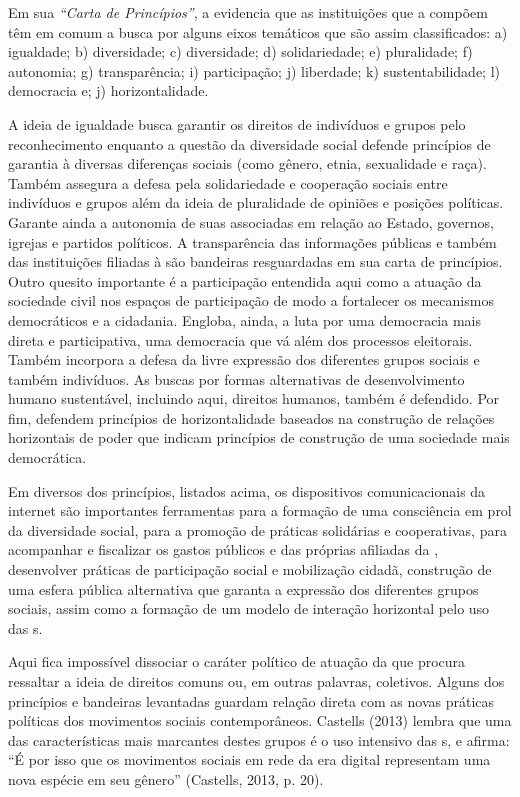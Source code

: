 Em sua \emph{``Carta de Princípios''}, a  evidencia que as
instituições que a compõem têm em comum a busca por alguns eixos
temáticos que são assim classificados: a) igualdade; b) diversidade; c)
diversidade; d) solidariedade; e) pluralidade; f) autonomia; g)
transparência; i) participação; j) liberdade; k) sustentabilidade; l)
democracia e; j) horizontalidade.

A ideia de igualdade busca garantir os direitos de indivíduos e grupos
pelo reconhecimento enquanto a questão da diversidade social defende
princípios de garantia à diversas diferenças sociais (como gênero,
etnia, sexualidade e raça). Também assegura a defesa pela solidariedade
e cooperação sociais entre indivíduos e grupos além da ideia de
pluralidade de opiniões e posições políticas. Garante ainda a autonomia
de suas associadas em relação ao Estado, governos, igrejas e partidos
políticos. A transparência das informações públicas e também das
instituições filiadas à  são bandeiras resguardadas em sua carta de
princípios. Outro quesito importante é a participação entendida aqui
como a atuação da sociedade civil nos espaços de participação de modo a
fortalecer os mecanismos democráticos e a cidadania. Engloba, ainda, a
luta por uma democracia mais direta e participativa, uma democracia que
vá além dos processos eleitorais. Também incorpora a defesa da livre
expressão dos diferentes grupos sociais e também indivíduos. As buscas
por formas alternativas de desenvolvimento humano sustentável, incluindo
aqui, direitos humanos, também é defendido. Por fim, defendem princípios
de horizontalidade baseados na construção de relações horizontais de
poder que indicam princípios de construção de uma sociedade mais
democrática.

Em diversos dos princípios, listados acima, os dispositivos
comunicacionais da internet são importantes ferramentas para a formação
de uma consciência em prol da diversidade social, para a promoção de
práticas solidárias e cooperativas, para acompanhar e fiscalizar os
gastos públicos e das próprias afiliadas da , desenvolver práticas
de participação social e mobilização cidadã, construção de uma esfera
pública alternativa que garanta a expressão dos diferentes grupos
sociais, assim como a formação de um modelo de interação horizontal pelo
uso das s.

Aqui fica impossível dissociar o caráter político de atuação da 
que procura ressaltar a ideia de direitos comuns ou, em outras palavras,
coletivos. Alguns dos princípios e bandeiras levantadas guardam relação
direta com as novas práticas políticas dos movimentos sociais
contemporâneos. Castells (2013) lembra que uma das características mais
marcantes destes grupos é o uso intensivo das s, e afirma: ``É por
isso que os movimentos sociais em rede da era digital representam uma
nova espécie em seu gênero'' (Castells, 2013, p. 20).

